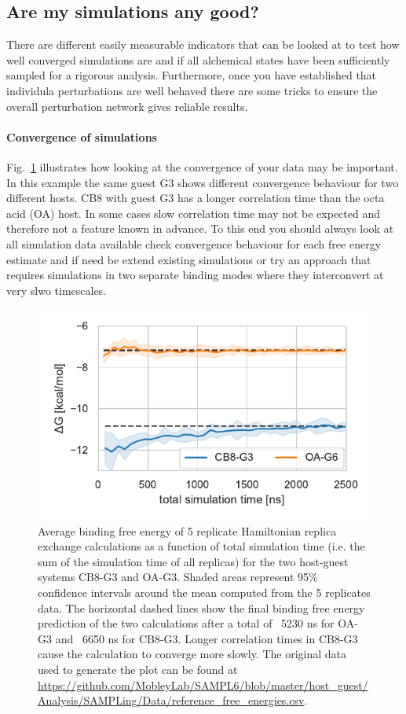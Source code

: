 \documentclass[9pt,bestpractices]{livecoms}
\begin{document}
\subsection{Are my simulations any good?}
\label{sec:are-they-good}
There are different easily measurable indicators that can be looked at to test how well converged simulations are and if all alchemical states have been sufficiently sampled for a rigorous analysis. Furthermore, once you have established that individula perturbations are well behaved there are some tricks to ensure the overall perturbation network gives reliable results.
%
\paragraph{Convergence of simulations}
Fig.~\ref{fig:freeenergytrajectories} illustrates how looking at the convergence of your data may be important. In this example the same guest G3 shows different convergence behaviour for two different hosts. CB8 with guest G3 has a longer correlation time than the octa acid (OA) host. In some cases slow correlation time may not be expected and therefore not a feature known in advance. To this end you should always look at all simulation data available check convergence behaviour for each free energy estimate and if need be extend existing simulations or try an approach that requires simulations in two separate binding modes where they interconvert at very slwo timescales.   
\begin{figure}
    \includegraphics[width=0.90\linewidth]{figures/fig9_convergence/Figure.pdf}
    \caption{Average binding free energy of 5 replicate Hamiltonian replica exchange calculations as a function of total simulation time (i.e. the sum of the simulation time of all replicas) for the two host-guest systems CB8-G3 and OA-G3. Shaded areas represent 95\% confidence intervals around the mean computed from the 5 replicates data. The horizontal dashed lines show the final binding free energy prediction of the two calculations after a total of ~5230 ns for OA-G3 and ~6650 ns for CB8-G3. Longer correlation times in CB8-G3 cause the calculation to converge more slowly. The original data used to generate the plot can be found at \url{https://github.com/MobleyLab/SAMPL6/blob/master/host_guest/Analysis/SAMPLing/Data/reference_free_energies.csv}.
}
    \label{fig:freeenergytrajectories}
\end{figure}
%
\end{document}
